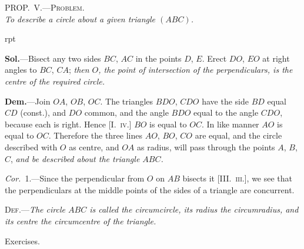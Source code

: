 \documentclass[oneside]{book}
\newcommand\myprop[2]{
\bigskip\Needspace*{4\baselineskip}\begin{center}\textsc{#1}\\\medskip\emph{#2}\par\end{center}
}
\newcommand\exhead[1]{
\Needspace*{5\baselineskip}\begin{center}
\textsf{#1}
\end{center}
}
\newcommand\imgflow[3]{
\setcounter{wrapwidth}{#1}
\begin{wrapfigure}[#2]{r}{\value{wrapwidth}pt}
\begin{center}
\vspace{-0.3in}
\end{center}
\end{wrapfigure}
}
\begin{document}
\myprop{PROP\@.~V.---Problem.}{To describe a circle about a given triangle $(ABC)$.}

\imgflow{108}{10}{f156}

\textbf{Sol.}---Bisect any two sides $BC$, $AC$ in the points $D$, $E$.
Erect $DO$, $EO$ at right angles to $BC$,
$CA$; \emph{then $O$, the point of intersection
of the perpendiculars, is the centre
of the required circle.}

\textbf{Dem.}---Join $OA$, $OB$, $OC$. The
triangles $BDO$, $CDO$ have the side
$BD$ equal $CD$ (const.), and $DO$ common,
and the angle $BDO$ equal to
the angle $CDO$, because each is
right. Hence [I.~\textsc{iv.}] $BO$ is equal to $OC$. In like
manner $AO$ is equal to $OC$. Therefore the three lines
$AO$, $BO$, $CO$ are equal, and the circle described with
$O$ as centre, and $OA$ as radius, will pass through the
points $A$, $B$, $C$, \emph{and be described about the triangle $ABC$.}

\emph{Cor.}~1.---Since the perpendicular from $O$ on $AB$ bisects
it [III\@.~\textsc{iii.}], we see that the perpendiculars at the
middle points of the sides of a triangle are concurrent.

\textsc{Def.}---\textit{The circle $ABC$ is called the circumcircle, its
radius the circumradius, and its centre the circumcentre
of the triangle.}

\exhead{Exercises.}
\end{document}
